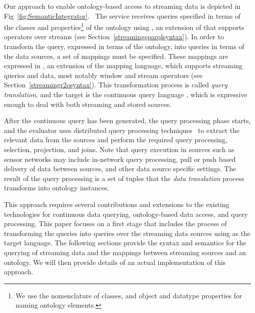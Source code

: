 Our approach to enable ontology-based access to streaming data is depicted in Fig~\ref{fig:SemanticIntegrator}.\ %
The service receives queries specified in terms of the classes and properties\footnote{We use the \owl nomenclature of classes, and object and datatype properties for naming ontology elements.} of the ontology using \sparqlstr, an extension of \sparql that supports operators over \rdf streams (see Section~\ref{streamingsparqlsyntax}).
In order to transform the \sparqlstr query, expressed in terms of the ontology, into queries in terms of the data sources, a set of mappings must be specified.
These mappings are expressed in \stwoo, an extension of the \rtwoo mapping language, which supports streaming queries and data, most notably window and stream operators (see Section~\ref{streamingr2osyntax}).
This transformation process is called \textit{query translation}, and the target is the continuous query language \sneeql, which is expressive enough to deal with both streaming and stored sources.

After the continuous query has been generated, the query processing phase starts, and the evaluator uses distributed query processing techniques~\cite{Kossmann_00} to extract the relevant data from the sources and perform the required query processing, \eg selection, projection, and joins. %
%
Note that query execution in sources such as sensor networks may include in-network query processing, pull or push based delivery of data between sources, and other data source specific settings. The result of the query processing is a set of tuples that the \textit{data translation} process transforms into ontology instances.

This approach requires several contributions and extensions to the existing technologies for continuous data querying, ontology-based data access, and \sparql query processing. This paper focuses on a first stage that includes the process of transforming the \sparqlstr queries into queries over the streaming data sources using \sneeql as the target language. The following sections provide the syntax and semantics for the querying of streaming \rdf data and the mappings between streaming sources and an ontology. We will then provide details of an actual implementation of this approach.

